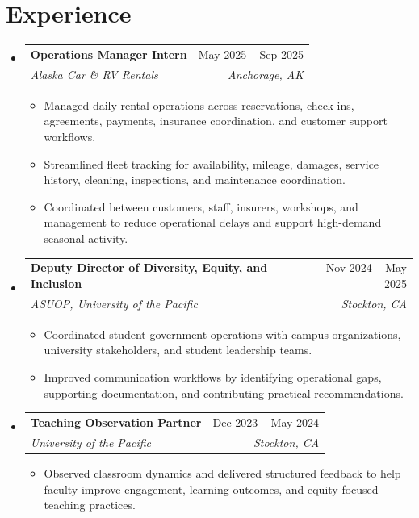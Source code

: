 \documentclass[letterpaper,10.5pt]{article}
\makeatletter
\newcommand{\resumeItem}[1]{\item #1}
\newcommand{\resumeSubheading}[4]{
  \item
  \begin{tabular*}{0.97\textwidth}{@{\extracolsep{\fill}} l r}
    \textbf{#1} & #2 \\
    \textit{#3} & \textit{#4}
  \end{tabular*}
}
\makeatother
\begin{document}
\section{Experience}
\begin{itemize}

\resumeSubheading
  {Operations Manager Intern}{May 2025 -- Sep 2025}
  {Alaska Car \& RV Rentals}{Anchorage, AK}
\begin{itemize}
  \resumeItem{Managed daily rental operations across reservations, check-ins, agreements, payments, insurance coordination, and customer support workflows.}
  \resumeItem{Streamlined fleet tracking for availability, mileage, damages, service history, cleaning, inspections, and maintenance coordination.}
  \resumeItem{Coordinated between customers, staff, insurers, workshops, and management to reduce operational delays and support high-demand seasonal activity.}
\end{itemize}

\resumeSubheading
  {Deputy Director of Diversity, Equity, and Inclusion}{Nov 2024 -- May 2025}
  {ASUOP, University of the Pacific}{Stockton, CA}
\begin{itemize}
  \resumeItem{Coordinated student government operations with campus organizations, university stakeholders, and student leadership teams.}
  \resumeItem{Improved communication workflows by identifying operational gaps, supporting documentation, and contributing practical recommendations.}
\end{itemize}

\resumeSubheading
  {Teaching Observation Partner}{Dec 2023 -- May 2024}
  {University of the Pacific}{Stockton, CA}
\begin{itemize}
  \resumeItem{Observed classroom dynamics and delivered structured feedback to help faculty improve engagement, learning outcomes, and equity-focused teaching practices.}
\end{itemize}

\end{itemize}

\end{document}
